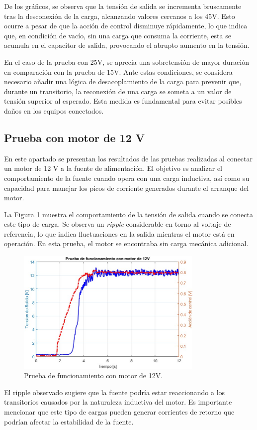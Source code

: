 De los gráficos, se observa que la tensión de salida se incrementa bruscamente tras la desconexión de la carga, alcanzando valores cercanos a los 45V. Esto ocurre a pesar de que la acción de control disminuye rápidamente, lo que indica que, en condición de vacío, sin una carga que consuma la corriente, esta se acumula en el capacitor de salida, provocando el abrupto aumento en la tensión. \par
En el caso de la prueba con 25V, se aprecia una sobretensión de mayor duración en comparación con la prueba de 15V. Ante estas condiciones, se considera necesario añadir una lógica de desacoplamiento de la carga para prevenir que, durante un transitorio, la reconexión de una carga se someta a un valor de tensión superior al esperado. Esta medida es fundamental para evitar posibles daños en los equipos conectados. \par 

\subsection{Prueba con motor de 12 V}
En este apartado se presentan los resultados de las pruebas realizadas al conectar un motor de 12 V a la fuente de alimentación. El objetivo es analizar el comportamiento de la fuente cuando opera con una carga inductiva, así como su capacidad para manejar los picos de corriente generados durante el arranque del motor. \par 
La Figura \ref{F:Motor12} muestra el comportamiento de la tensión de salida cuando se conecta este tipo de carga. Se observa un \textit{ripple} considerable en torno al voltaje de referencia, lo que indica fluctuaciones en la salida mientras el motor está en operación. En esta prueba, el motor se encontraba sin carga mecánica adicional. \par 
\begin{figure}[H]
    \centering
    \includegraphics[width=0.8\textwidth]{./imagenes/Motor2.jpg}
    \caption{Prueba de funcionamiento con motor de 12V.}
    \label{F:Motor12}
\end{figure}\par 
El ripple observado sugiere que la fuente podría estar reaccionando a los transitorios causados por la naturaleza inductiva del motor. Es importante mencionar que este tipo de cargas pueden generar corrientes de retorno que podrían afectar la estabilidad de la fuente. \par 

